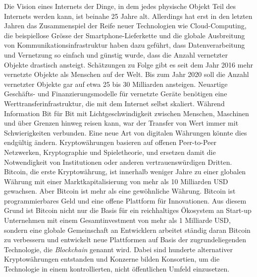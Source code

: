 Die Vision eines Internets der Dinge, in dem jedes physische Objekt Teil des Internets werden kann, ist beinahe 25 Jahre alt. Allerdings hat erst in den letzten Jahren das Zusammenspiel der Reife neuer Technologien wie Cloud-Computing, die beispiellose Gr{\"o}sse der Smartphone-Lieferkette und die globale Ausbreitung von Kommunikationsinfrastruktur haben dazu geführt, dass Datenverarbeitung und Vernetzung so einfach und g{\"u}nstig wurde, dass die Anzahl vernetzter Objekte drastisch ansteigt. Sch{\"a}tzungen zu Folge gibt es seit dem Jahr 2016 mehr vernetzte Objekte als Menschen auf der Welt. Bis zum Jahr 2020 soll die Anzahl vernetzter Objekte gar auf etwa 25 bis 30 Milliarden ansteigen. Neuartige Gesch{\"a}fts- und Finanzierungsmodelle für vernetzte Ger{\"a}te ben{\"o}tigen eine Werttransferinfrastruktur, die mit dem Internet selbst skaliert. W{\"a}hrend Information Bit f{\"u}r Bit mit Lichtgeschwindigkeit zwischen Menschen, Maschinen und über Grenzen hinweg reisen kann, war der Transfer von Wert immer mit Schwierigkeiten verbunden. Eine neue Art von digitalen W{\"a}hrungen könnte dies endg{\"u}ltig {\"a}ndern. Kryptow{\"a}hrungen basieren auf offenen Peer-to-Peer Netzwerken, Kryptographie und Spieletheorie, und ersetzen damit die Notwendigkeit von Institutionen oder anderen vertrauensw{\"u}rdigen Dritten. Bitcoin, die erste Kryptow{\"a}hrung, ist innerhalb weniger Jahre zu einer globalen W{\"a}hrung mit einer Marktkapitalisierung von mehr als 10 Milliarden USD gewachsen. Aber Bitcoin ist mehr als eine gew{\"o}hnliche W{\"a}hrung. Bitcoin ist programmierbares Geld und eine offene Plattform für Innovationen. Aus diesem Grund ist Bitcoin nicht nur die Basis f{\"u}r ein reichhaltiges {\"O}kosystem an Start-up Unternehmen mit einem Gesamtinvestment von mehr als 1 Milliarde USD, sondern eine globale Gemeinschaft an Entwicklern arbeitet st{\"a}ndig daran Bitcoin zu verbessern und entwickelt neue Plattformen auf Basis der zugrundeliegenden Technologie, die \emph{Blockchain} genannt wird. Dabei sind hunderte alternativer Kryptow{\"a}hrungen entstanden und Konzerne bilden Konsortien, um die Technologie in einem kontrollierten, nicht {\"o}ffentlichen Umfeld einzusetzen. 


